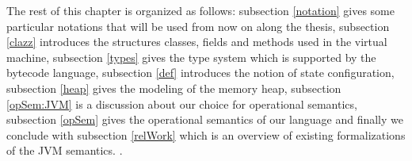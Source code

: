 

  
 The rest of this chapter is organized as follows:
 subsection \ref{notation} gives some particular notations that will be used from now on along the thesis,
 subsection \ref{clazz} introduces the structures classes, fields and methods  used in the virtual machine, 
 subsection \ref{types} gives the type system which is supported by the bytecode language,
 subsection \ref{def} introduces the notion of state configuration,
 subsection \ref{heap} gives the modeling of the memory heap,
 subsection \ref{opSem:JVM} is a discussion about our choice for operational semantics,
 subsection \ref{opSem} gives the operational semantics of our language 
 and finally we conclude with subsection \ref{relWork}  which is an overview of existing formalizations of the JVM semantics.
.

